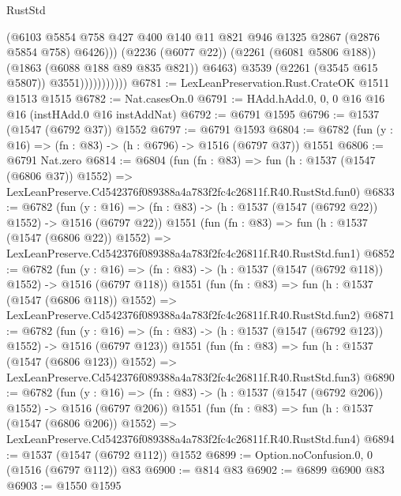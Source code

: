 \begin{lexlean}{RustStd}
\begin{coremodule}
                                (@6103
                                  @5854
                                  @758
                                  @427
                                  @400
                                  @140
                                  @11
                                  @821
                                  @946
                                  @1325
                                  @2867
                                  (@2876 @5854 @758)
                                  @6426)))
                            (@2236 (@6077 @22))
                            (@2261 (@6081 @5806 @188))
                            (@1863 (@6088 @188 @89 @835 @821))
                            @6463)
                          @3539
                          (@2261 (@3545 @615 @5807))
                          @3551)))))))))))
@6781 := LexLeanPreservation.Rust.CrateOK @1511 @1513 @1515
@6782 := Nat.casesOn.{0}
@6791 := HAdd.hAdd.{0, 0, 0} @16 @16 @16 (instHAdd.{0} @16 instAddNat)
@6792 := @6791 @1595
@6796 := @1537 (@1547 (@6792 @37)) @1552
@6797 := @6791 @1593
@6804 := @6782 (fun (y : @16) => (fn : @83) -> (h : @6796) -> @1516 (@6797 @37)) @1551
@6806 := @6791 Nat.zero
@6814 := @6804
    (fun (fn : @83) =>
    fun (h : @1537 (@1547 (@6806 @37)) @1552) =>
    LexLeanPreserve.Cd542376f089388a4a783f2fc4c26811f.R40.RustStd.fun0)
@6833 := @6782
    (fun (y : @16) => (fn : @83) -> (h : @1537 (@1547 (@6792 @22)) @1552) -> @1516 (@6797 @22))
    @1551
    (fun (fn : @83) =>
    fun (h : @1537 (@1547 (@6806 @22)) @1552) =>
    LexLeanPreserve.Cd542376f089388a4a783f2fc4c26811f.R40.RustStd.fun1)
@6852 := @6782
    (fun (y : @16) => (fn : @83) -> (h : @1537 (@1547 (@6792 @118)) @1552) -> @1516 (@6797 @118))
    @1551
    (fun (fn : @83) =>
    fun (h : @1537 (@1547 (@6806 @118)) @1552) =>
    LexLeanPreserve.Cd542376f089388a4a783f2fc4c26811f.R40.RustStd.fun2)
@6871 := @6782
    (fun (y : @16) => (fn : @83) -> (h : @1537 (@1547 (@6792 @123)) @1552) -> @1516 (@6797 @123))
    @1551
    (fun (fn : @83) =>
    fun (h : @1537 (@1547 (@6806 @123)) @1552) =>
    LexLeanPreserve.Cd542376f089388a4a783f2fc4c26811f.R40.RustStd.fun3)
@6890 := @6782
    (fun (y : @16) => (fn : @83) -> (h : @1537 (@1547 (@6792 @206)) @1552) -> @1516 (@6797 @206))
    @1551
    (fun (fn : @83) =>
    fun (h : @1537 (@1547 (@6806 @206)) @1552) =>
    LexLeanPreserve.Cd542376f089388a4a783f2fc4c26811f.R40.RustStd.fun4)
@6894 := @1537 (@1547 (@6792 @112)) @1552
@6899 := Option.noConfusion.{0, 0} (@1516 (@6797 @112)) @83
@6900 := @814 @83
@6902 := @6899 @6900 @83
@6903 := @1550 @1595

\end{coremodule}
\end{lexlean}
